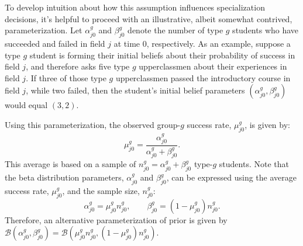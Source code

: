 \documentclass[11 pt]{article}
\newcommand{\toedit}[1]{{\color{gray}#1}}
\newcommand{\toedit}[1]{#1}
\newcommand{\pr}[1]{\left( #1 \right)}
\begin{document}

\toedit{To develop intuition about how this assumption influences specialization decisions, it's helpful to proceed with an illustrative, albeit somewhat contrived, parameterization.}
Let $\alpha_{j0}^g$ and $\beta_{j0}^g$ denote the number of type $g$ students who have succeeded and failed in field $j$ at time 0, respectively.
As an example, suppose a type $g$ student is forming their initial beliefs about their probability of success in field $j$, and therefore asks five type $g$ upperclassmen about their experiences in field $j$.
If three of those type $g$ upperclassmen passed the introductory course in field $j$, while two failed, then the student's initial belief parameters $(\alpha_{j0}^g, \beta_{j0}^g)$ would equal $(3, 2)$.


Using this parameterization, the observed group-$g$ success rate, $\mu_{j0}^g$, is given by:
\begin{equation*}
\mu_{j0}^g = 
  \frac{\alpha_{j0}^g}{\alpha_{j0}^g + \beta_{j0}^g}.
\end{equation*}
This average is based on a sample of $n_{j0}^g = \alpha_{j0}^g + \beta_{j0}^g$ type-$g$ students.
Note that the beta distribution parameters, $\alpha_{j0}^g$ and $\beta_{j0}^g$, can be expressed using the average success rate, $\mu_{j0}^g$, and the sample size, $n_{j0}^g$:
\begin{equation*}
     \alpha_{j0}^g = \mu_{j0}^g n_{j0}^g,
     \quad \quad \beta_{j0}^g = (1 - \mu_{j0}^g) n_{j0}^g.
 \end{equation*}
 Therefore, an alternative parameterization of prior is given by $\mathcal{B} \pr{\alpha_{j0}^g, \beta_{j0}^g} = \mathcal{B} \pr{\mu_{j0}^g n_{j0}^g, (1 - \mu_{j0}^g) n_{j0}^g}$.
 
\end{document}
